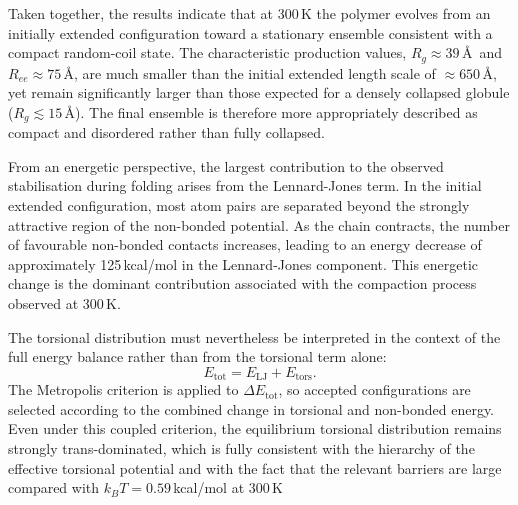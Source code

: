 Taken together, the results indicate that at 300\,K the polymer evolves
from an initially extended configuration toward a stationary ensemble
consistent with a compact random-coil state. The characteristic
production values, $R_g \approx 39$\,\AA\ and
$R_{ee} \approx 75$\,\AA, are much smaller than the initial extended
length scale of ${\approx}650$\,\AA, yet remain significantly larger
than those expected for a densely collapsed globule
($R_g \lesssim 15$\,\AA). The final ensemble is therefore more
appropriately described as compact and disordered rather than fully
collapsed.

From an energetic perspective, the largest contribution to the observed
stabilisation during folding arises from the Lennard-Jones term. In the
initial extended configuration, most atom pairs are separated beyond
the strongly attractive region of the non-bonded potential. As the
chain contracts, the number of favourable non-bonded contacts increases,
leading to an energy decrease of approximately 125\,kcal/mol in the
Lennard-Jones component. This energetic change is the dominant
contribution associated with the compaction process observed at 300\,K.

The torsional distribution must nevertheless be interpreted in the
context of the full energy balance rather than from the torsional term
alone:
\begin{equation}
  E_{\mathrm{tot}} = E_{\mathrm{LJ}} + E_{\mathrm{tors}}.
\end{equation}
The Metropolis criterion is applied to $\Delta E_{\mathrm{tot}}$, so
accepted configurations are selected according to the combined change in
torsional and non-bonded energy. Even under this coupled criterion, the
equilibrium torsional distribution remains strongly trans-dominated,
which is fully consistent with the hierarchy of the effective torsional
potential and with the fact that the relevant barriers are large
compared with $k_B T = 0.59$\,kcal/mol at 300\,K